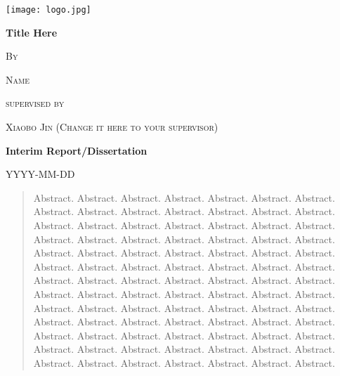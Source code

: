 \documentclass{scrartcl}
\begin{document}
\begin{titlepage}
	\centering
	\texttt{[image: logo.jpg]}\par
	\vspace{2cm}
	{\huge\bfseries Title Here\par}  
	\vspace{2cm}
	{\scshape\LARGE By \par}                
	\vspace{1cm}
	{\scshape\LARGE Name \par}      
	\vspace{0.5cm}
	\vspace{1.5cm}
	{\scshape\Large supervised by \par}
	\vspace{1cm}
	{\scshape\Large Xiaobo Jin (Change it here to your supervisor)\par}
	\vspace{3cm}
	{\huge\bfseries Interim Report/Dissertation \par}
	\vfill
	{\scshape\Large YYYY-MM-DD \par}
	\vfill
\end{titlepage}

\newpage
\onehalfspacing

\begin{abstract}

Abstract. Abstract. Abstract. Abstract. Abstract. Abstract. Abstract. Abstract. Abstract. Abstract. Abstract. Abstract. Abstract. Abstract. Abstract. Abstract. Abstract. Abstract. Abstract. Abstract. Abstract. Abstract. Abstract. Abstract. Abstract. Abstract. Abstract. Abstract. Abstract. Abstract. Abstract. Abstract. Abstract. Abstract. Abstract. Abstract. Abstract. Abstract. Abstract. Abstract. Abstract. Abstract. Abstract. Abstract. Abstract. Abstract. Abstract. Abstract. Abstract. Abstract. Abstract. Abstract. Abstract. Abstract. Abstract. Abstract. Abstract. Abstract. Abstract. Abstract. Abstract. Abstract. Abstract. Abstract. Abstract. Abstract. Abstract. Abstract. Abstract. Abstract. Abstract. Abstract. Abstract. Abstract. Abstract. Abstract. Abstract. Abstract. Abstract. Abstract. Abstract. Abstract. Abstract. Abstract. Abstract. Abstract. Abstract. Abstract. Abstract. Abstract. Abstract. 

\end{abstract}
\vspace{1cm}
\end{document}
